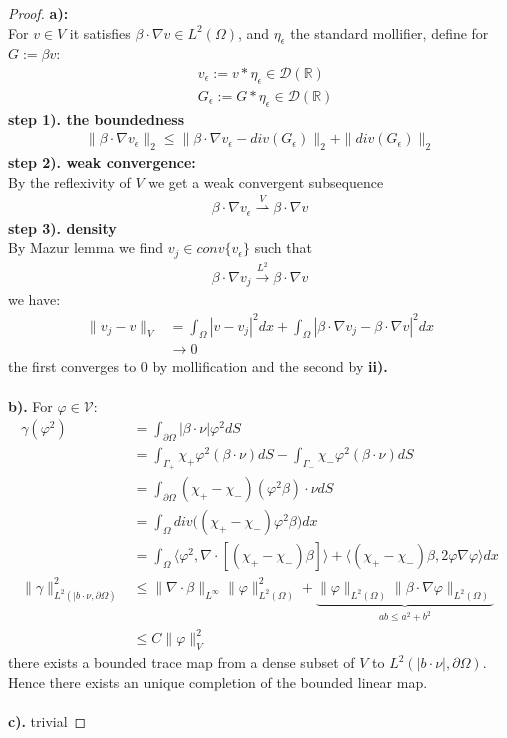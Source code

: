 \documentclass[a4paper,11pt,oneside,fleqn]{book}
\theoremstyle{definition}
\theoremstyle{remark}
\begin{document}
\begin{proof}
\textbf{a):}\\
For $v \in V$ it satisfies $\beta \cdot \nabla v \in L^2(\Omega)$, and $\eta_\epsilon$ the standard mollifier, define for $G:= \beta v$:
\begin{align*}
	&v_\epsilon := v * \eta_\epsilon \in \mathcal{D}(\mathbb{R}) \\
	&G_\epsilon := G * \eta_\epsilon \in \mathcal{D}(\mathbb{R})
\end{align*}
\textbf{step 1). the boundedness}
\begin{align*}
	\|\beta \cdot \nabla v_\epsilon \|_2 \le \|\beta \cdot \nabla v_\epsilon - div(G_\epsilon)\|_2 + \|div(G_\epsilon)\|_2
\end{align*}
\textbf{step 2). weak convergence:}\\ By the reflexivity of $V$ we get a weak convergent subsequence 
\begin{align*}
	\beta \cdot \nabla v_\epsilon \overset{V}{\rightharpoonup} \beta \cdot \nabla v
\end{align*}
\textbf{step 3). density}\\ By Mazur lemma we find $v_j \in conv\{v_\epsilon\}$ such that 
\begin{align*}
	\beta \cdot \nabla v_j \overset{L^2}{\longrightarrow} \beta \cdot \nabla v
\end{align*}
we have:
\begin{align*}
	\|v_j - v\|_V 
	&= \int_\Omega |v - v_j|^2 dx + \int_\Omega |\beta \cdot \nabla v_j - \beta \cdot \nabla v|^2 dx \\
	&\rightarrow 0
\end{align*}
the first converges to 0 by mollification and the second by \textbf{ii).}\\
\quad\\
\textbf{b).} For $\varphi \in \mathcal{V}$:
\begin{align*}
	\gamma(\varphi^2) 
	&= \int_{\partial\Omega} |\beta \cdot \nu| \varphi^2 dS \\
	&= \int_{\Gamma_+} \chi_+ \varphi^2 (\beta \cdot \nu) dS - \int_{\Gamma_-}\chi_- \varphi^2 (\beta \cdot \nu)dS\\
	&= \int_{\partial\Omega}(\chi_+ - \chi_-) (\varphi^2 \beta) \cdot \nu dS\\
	&= \int_\Omega div\bigg((\chi_+ - \chi_-)\varphi^2 \beta\bigg) dx\\
	&= \int_\Omega \langle \varphi^2, \nabla \cdot [(\chi_+ - \chi_-)\beta]\rangle + \langle(\chi_+ - \chi_-)\beta, 2\varphi\nabla \varphi\rangle dx \\
	\|\gamma\|_{L^2(|b \cdot \nu, \partial\Omega)}^2
	&\le \|\nabla \cdot \beta\|_{L^\infty}\|\varphi\|^2_{L^2(\Omega)} +
	\underbrace{ \|\varphi\|_{L^2(\Omega)} \|\beta \cdot \nabla \varphi\|_{L^2(\Omega)}}_{ab \le a^2 + b^2}\\
	&\le C \|\varphi\|_V^2
\end{align*}
there exists a bounded trace map from a dense subset of $V$ to $L^2(|b\cdot \nu|,\partial\Omega)$. Hence there exists an unique completion of the bounded linear map.\\
\quad\\
\textbf{c).} trivial	
\end{proof}
\end{document}
